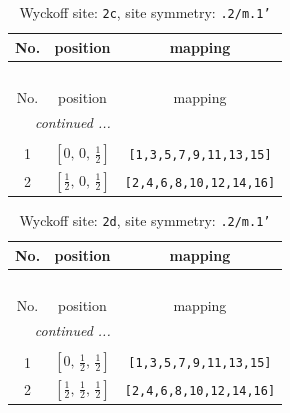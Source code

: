 \documentclass[fleqn,8pt]{jsarticle}
\begin{document}
\renewcommand{\arraystretch}{1.2}
\begin{longtable}{ccc}
\caption{Wyckoff site: {\tt 2c}, site symmetry: {\tt .2/m.1'}}
 \\
 \hline \hline
No. & position & mapping \\ \hline \endfirsthead

\multicolumn{2}{l}{\tablename\ \thetable{}} \\
 \hline \hline
No. & position & mapping \\ \hline \endhead

 \hline \hline
\multicolumn{2}{r}{\footnotesize\it continued ...} \\ \endfoot

 \hline \hline
\multicolumn{2}{r}{} \\ \endlastfoot

1 & $\left[ 0,\, 0,\, \frac{1}{2} \right]$ & {\tt [1,3,5,7,9,11,13,15]} \\ \hline
2 & $\left[ \frac{1}{2},\, 0,\, \frac{1}{2} \right]$ & {\tt [2,4,6,8,10,12,14,16]} \\
\end{longtable}
\renewcommand{\arraystretch}{1.2}
\begin{longtable}{ccc}
\caption{Wyckoff site: {\tt 2d}, site symmetry: {\tt .2/m.1'}}
 \\
 \hline \hline
No. & position & mapping \\ \hline \endfirsthead

\multicolumn{2}{l}{\tablename\ \thetable{}} \\
 \hline \hline
No. & position & mapping \\ \hline \endhead

 \hline \hline
\multicolumn{2}{r}{\footnotesize\it continued ...} \\ \endfoot

 \hline \hline
\multicolumn{2}{r}{} \\ \endlastfoot

1 & $\left[ 0,\, \frac{1}{2},\, \frac{1}{2} \right]$ & {\tt [1,3,5,7,9,11,13,15]} \\ \hline
2 & $\left[ \frac{1}{2},\, \frac{1}{2},\, \frac{1}{2} \right]$ & {\tt [2,4,6,8,10,12,14,16]} \\
\end{longtable}
\renewcommand{\arraystretch}{1.2}
\end{document}
